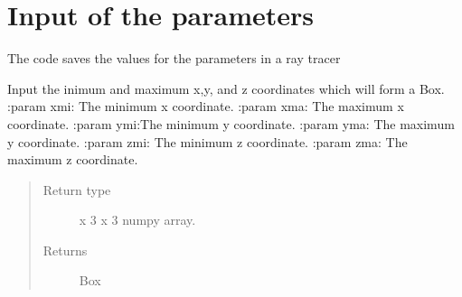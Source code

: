 \documentclass[letterpaper,10pt,english]{sphinxmanual}
\begin{document}
\chapter{Input of the parameters}
\label{\detokenize{index:module-ParameterInput}}\label{\detokenize{index:input-of-the-parameters}}
The code saves the values for the parameters in a ray tracer

\begin{fulllineitems}
\label{\detokenize{index:ParameterInput.BoxBuild}}
Input the inimum and maximum x,y, and z co\sphinxhyphen{}ordinates which will form a Box.
:param xmi: The minimum x co\sphinxhyphen{}ordinate.
:param xma: The maximum x co\sphinxhyphen{}ordinate.
:param ymi:The minimum y co\sphinxhyphen{}ordinate.
:param yma: The maximum y co\sphinxhyphen{}ordinate.
:param zmi: The minimum z co\sphinxhyphen{}ordinate.
:param zma: The maximum z co\sphinxhyphen{}ordinate.

\begin{sphinxVerbatim}[commandchars=\\\{\}]
\PYG{p}{[}\PYG{p}{]}
\PYG{p}{[}\PYG{p}{]}
\PYG{p}{[}\PYG{p}{]}
\PYG{p}{[}\PYG{p}{]}
\PYG{p}{[}\PYG{p}{]}
\end{sphinxVerbatim}
\begin{quote}\begin{description}
\item[{Return type}]  x 3 x 3 numpy array.

\item[{Returns}] \leavevmode
Box

\end{description}\end{quote}

\end{fulllineitems}
\end{document}
